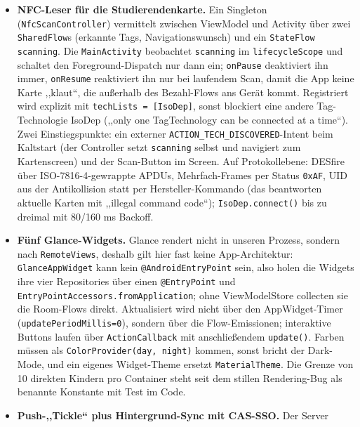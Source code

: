 \documentclass{msereport}
\begin{document}
\begin{itemize}
  \item \textbf{NFC-Leser für die Studierendenkarte.} Ein Singleton
        (\texttt{NfcScanController}) vermittelt zwischen ViewModel und Activity
        über zwei \texttt{SharedFlow}s (erkannte Tags, Navigationswunsch) und ein
        \texttt{StateFlow} \texttt{scanning}. Die \texttt{MainActivity}
        beobachtet \texttt{scanning} im \texttt{lifecycleScope} und schaltet den
        Foreground-Dispatch nur dann ein; \texttt{onPause} deaktiviert ihn immer,
        \texttt{onResume} reaktiviert ihn nur bei laufendem Scan, damit die App
        keine Karte ,,klaut``, die außerhalb des Bezahl-Flows ans Gerät kommt.
        Registriert wird explizit mit \texttt{techLists = [IsoDep]}, sonst
        blockiert eine andere Tag-Technologie IsoDep (,,only one TagTechnology
        can be connected at a time``). Zwei Einstiegspunkte: ein externer
        \texttt{ACTION\_TECH\_DISCOVERED}-Intent beim Kaltstart (der Controller
        setzt \texttt{scanning} selbst und navigiert zum Kartenscreen) und der
        Scan-Button im Screen. Auf Protokollebene: DESfire über
        ISO-7816-4-gewrappte APDUs, Mehrfach-Frames per Status \texttt{0xAF},
        UID aus der Antikollision statt per Hersteller-Kommando (das beantworten
        aktuelle Karten mit ,,illegal command code``);
        \texttt{IsoDep.connect()} bis zu dreimal mit 80/160 ms Backoff.
  \item \textbf{Fünf Glance-Widgets.} Glance rendert nicht in unseren Prozess,
        sondern nach \texttt{RemoteViews}, deshalb gilt hier fast keine
        App-Architektur: \texttt{GlanceAppWidget} kann kein
        \texttt{@AndroidEntryPoint} sein, also holen die Widgets ihre vier
        Repositories über einen \texttt{@EntryPoint} und
        \texttt{EntryPointAccessors.fromApplication}; ohne ViewModelStore
        collecten sie die Room-Flows direkt. Aktualisiert wird nicht über den
        AppWidget-Timer (\texttt{updatePeriodMillis=0}), sondern über die
        Flow-Emissionen; interaktive Buttons laufen über \texttt{ActionCallback}
        mit anschließendem \texttt{update()}. Farben müssen als
        \texttt{ColorProvider(day, night)} kommen, sonst bricht der Dark-Mode,
        und ein eigenes Widget-Theme ersetzt \texttt{MaterialTheme}. Die Grenze
        von 10 direkten Kindern pro Container steht seit dem stillen
        Rendering-Bug als benannte Konstante mit Test im Code.
  \item \textbf{Push-,,Tickle`` plus Hintergrund-Sync mit CAS-SSO.} Der Server

\end{itemize}
\end{document}

